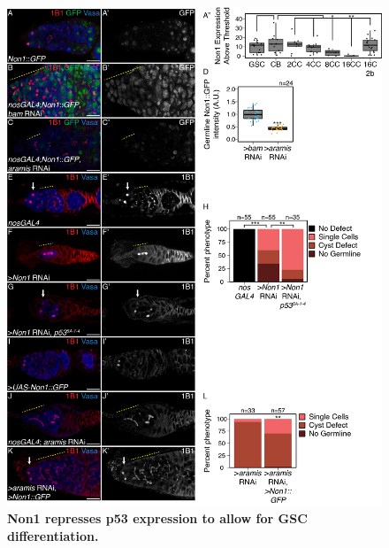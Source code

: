 \documentclass[12pt,oneside]{reedthesis}
\begin{document}
\begin{figure}

{\centering \includegraphics[width=6.5 in,height=8.9375 in]{./figure/Ribosome Biogenesis/Ribosome Biogenesis 5} 

}

\caption[\textbf{Non1 represses p53 expression to allow for GSC differentiation.}]{\textbf{Non1 represses p53 expression to allow for GSC differentiation.}}\label{fig:unnamed-chunk-14}
\end{figure}
\end{document}
